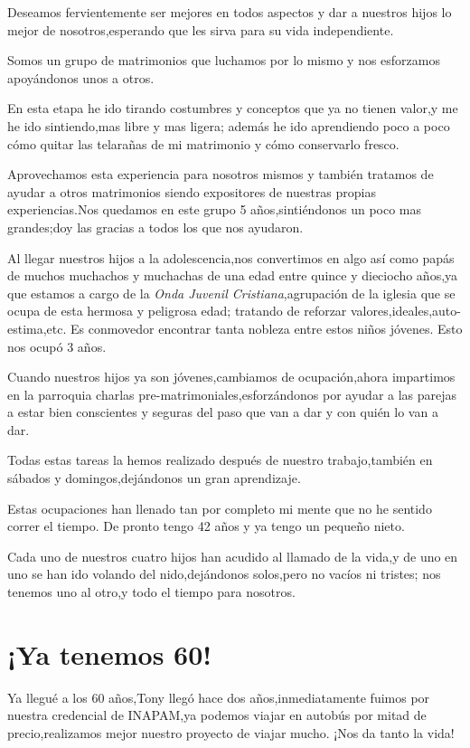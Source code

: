 \documentclass[letterpaper,12pt]{book}
\begin{document}
Deseamos fervientemente ser mejores en todos aspectos y dar a nuestros hijos lo mejor de nosotros,esperando que les sirva para su vida independiente.

Somos un grupo de matrimonios que luchamos por lo mismo y nos esforzamos apoyándonos unos a otros.

En esta etapa he ido tirando costumbres y conceptos que ya no tienen valor,y me he ido sintiendo,mas libre y mas ligera;
además he ido aprendiendo poco a poco cómo quitar las telarañas de mi matrimonio y cómo conservarlo fresco.

Aprovechamos esta experiencia para nosotros mismos y también tratamos de ayudar a otros matrimonios siendo expositores de nuestras propias experiencias.Nos quedamos en este grupo 5 años,sintiéndonos un poco mas grandes;doy las gracias a todos los que nos ayudaron.

Al llegar nuestros hijos a la adolescencia,nos convertimos en algo así como papás de muchos muchachos y muchachas de una edad entre quince y dieciocho años,ya que estamos a cargo de la \textit{Onda Juvenil Cristiana},agrupación de la iglesia que se ocupa de esta hermosa y peligrosa edad; tratando de reforzar valores,ideales,auto-estima,etc. Es conmovedor encontrar tanta nobleza entre estos niños jóvenes. Esto nos ocupó 3 años.

Cuando nuestros hijos ya son jóvenes,cambiamos de ocupación,ahora impartimos en la parroquia charlas pre-matrimoniales,esforzándonos por ayudar a las parejas a estar bien conscientes y seguras del paso que van a dar y con quién lo van a dar.

Todas estas tareas la hemos realizado después de nuestro trabajo,también en sábados y domingos,dejándonos un gran aprendizaje.

Estas ocupaciones han llenado tan por completo mi mente que no he sentido correr el tiempo. De pronto tengo 42 años y ya tengo un pequeño nieto.

Cada uno de nuestros cuatro hijos han acudido al llamado de la vida,y de uno en uno se han ido volando del nido,dejándonos solos,pero no vacíos ni tristes; nos tenemos uno al otro,y todo el tiempo para nosotros.

\chapter{¡Ya tenemos 60!}
Ya llegué a los 60 años,Tony llegó hace dos años,inmediatamente fuimos por nuestra credencial de INAPAM,ya podemos viajar en autobús por mitad de precio,realizamos mejor nuestro proyecto de viajar mucho. ¡Nos da tanto la vida!
\end{document}
